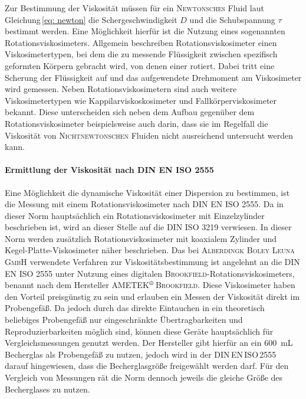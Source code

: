 Zur Bestimmung der Viskosität müssen für ein \textsc{Newtonsches} Fluid laut Gleichung\,\eqref{eq: newton} die Schergeschwindigkeit $D$ und die Schubspannung $\tau$ bestimmt werden. Eine Möglichkeit hierfür ist die Nutzung eines sogenannten Rotationsviskosimeters. Allgemein beschreiben Rotationsviskosimeter einen Viskosimetertypen, bei dem die zu messende Flüssigkeit zwischen spezifisch geformten Körpern gebracht wird, von denen einer rotiert. Dabei tritt eine Scherung der Flüssigkeit auf und das aufgewendete Drehmoment am Viskosimeter wird gemessen. Neben Rotationsviskosimetern sind auch weitere Viskosimetertypen wie Kappilarviskoskosimeter und Fallkörperviskosimeter bekannt. Diese unterscheiden sich neben dem Aufbau gegenüber dem Rotationsviskosimeter beispielsweise auch darin, dass sie im Regelfall die Viskosität von \textsc{Nichtnewtonschen} Fluiden nicht ausreichend untersucht werden kann. \cite{ROMPPRedaktion.2008}

\paragraph{Ermittlung der Viskosität nach DIN EN ISO 2555}
Eine Möglichkeit die dynamische Viskosität einer Dispersion zu bestimmen, ist die Messung mit einem Rotationsviskosimeter nach DIN EN ISO 2555. Da in dieser Norm hauptsächlich ein Rotationsviskosimeter mit Einzelzylinder beschrieben ist, wird an dieser Stelle auf die DIN ISO 3219 verwiesen. In dieser Norm werden zusätzlich Rotationsviskosimeter mit koaxialem Zylinder und Kegel-Platte-Viskosimeter näher beschrieben. \cite{DINDeutschesInstitutfurNormunge.V..Februar2013, DINDeutschesInstitutfurNormunge.V..September2018} \linebreak
Das bei \textsc{Alberdingk Boley Leuna GmbH} verwendete Verfahren zur Viskositätsbestimmung ist angelehnt an die DIN EN ISO 2555 unter Nutzung eines digitalen \textsc{Brookfield}-Rotationsviskosimeters, benannt nach dem Hersteller \textsc{AMETEK$^\text{\textregistered}$\,Brookfield}. Diese Viskosimeter haben den Vorteil preisgünstig zu sein und erlauben ein Messen der Viskosität direkt im Probengefäß. Da jedoch durch das direkte Eintauchen in ein theoretisch beliebiges Probengefäß nur eingeschränkte Übertragbarkeiten und Reproduzierbarkeiten möglich sind, können diese Geräte hauptsächlich für Vergleichsmessungen genutzt werden.  Der Hersteller gibt hierfür an ein \SI{600}{\milli \liter} Becherglas als Probengefäß zu nutzen, jedoch wird in der DIN\,EN\,ISO\,2555 darauf hingewiesen, dass die Becherglasgröße freigewählt werden darf. Für den Vergleich von Messungen rät die Norm dennoch jeweils die gleiche Größe des Becherglases zu nutzen. \cite{ROMPPRedaktion.2008, brookfield_31.01.2022, DINDeutschesInstitutfurNormunge.V..September2018}

